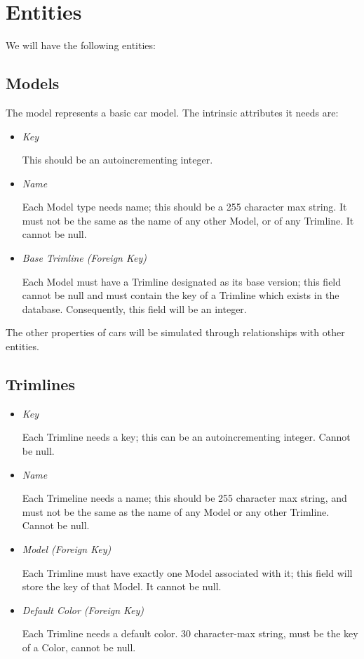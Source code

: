 \documentclass[11pt,letterpaper,oneside]{amsart}
\begin{document}
\section*{Entities}

We will have the following entities:

\subsection*{Models}
The model represents a basic car model.  The intrinsic attributes it needs are:
\begin{itemize}
	\item \emph{Key}
	
	This should be an autoincrementing integer.	
	
	\item \emph{Name}
	
	Each Model type needs name; this should be a 255 character max string.  It must not be the same as the name of any other Model, or of any Trimline.  It cannot be null.
	
	\item \emph{Base Trimline (Foreign Key)}
	
	Each Model must have a Trimline designated as its base version; this field cannot be null and must contain the key of a Trimline which exists in the database.  Consequently, this field will be an integer.
	
	
\end{itemize}

The other properties of cars will be simulated through relationships with other entities.

\subsection*{Trimlines}

\begin{itemize}
	\item \emph{Key}
	
	Each Trimline needs a key; this can be an autoincrementing integer. Cannot be null.
	
	\item \emph{Name}
	
	Each Trimeline needs a name; this should be 255 character max string, and must not be the same as the name of any Model or any other Trimline.  Cannot be null.

	\item \emph{Model (Foreign Key)}
	
	Each Trimline must have exactly one Model associated with it; this field will store the key of that Model.  It cannot be null.
	
	\item \emph{Default Color (Foreign Key)}
	
	Each Trimline needs a default color.  30 character-max string, must be the key of a Color, cannot be null.

\end{itemize}
\end{document}
